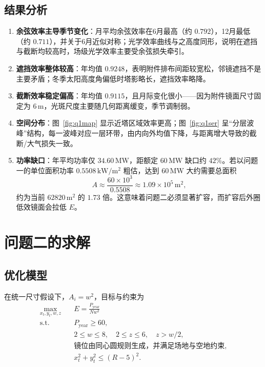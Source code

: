 \documentclass[withoutpreface,bwprint]{cumcmthesis}
\begin{document}
\subsection{结果分析}
\begin{enumerate}[leftmargin=2em]
  \item \textbf{余弦效率主导季节变化}：月平均余弦效率在6月最高（约 $0.792$），12月最低（约 $0.711$），并关于6月近似对称；光学效率曲线与之高度同形，说明在遮挡与截断均较高时，场级光学效率主要受余弦损失牵引。
  \item \textbf{遮挡效率整体较高}：年均值 $0.9248$，表明附件排布间距较宽松，邻镜遮挡不是主要矛盾；冬季太阳高度角偏低时塔影略长，遮挡效率略降。
  \item \textbf{截断效率稳定偏高}：年均值 $0.9115$，且月际变化很小——因为附件镜面尺寸固定为 $6\,\mathrm{m}$，光斑尺度主要随几何距离缓变，季节调制弱。
  \item \textbf{空间分布}：图~\ref{fig:q1map} 显示近塔区域效率更高；图~\ref{fig:q1ser} 呈“分层波峰”结构，每一波峰对应一层环带，由内向外均值下降，与距离增大导致的截断/大气损失一致。
  \item \textbf{功率缺口}：年平均功率仅 $34.60\,\mathrm{MW}$，距额定 $60\,\mathrm{MW}$ 缺口约 $42\%$。若以问题一的单位面积功率 $0.5508\,\mathrm{kW/m^2}$ 粗估，达到 $60\,\mathrm{MW}$ 大约需要总面积
  \[
  A\approx\frac{60\times10^3}{0.5508}\approx1.09\times10^5\,\mathrm{m^2},
  \]
  约为当前 $62820\,\mathrm{m^2}$ 的 $1.73$ 倍。这意味着问题二必须显著扩容，而扩容后外圈低效镜面会拉低 $E$。
\end{enumerate}

\section{问题二的求解}

\subsection{优化模型}
在统一尺寸假设下，$A_i=w^2$，目标与约束为
\begin{equation}
\begin{aligned}
\max_{x_t,y_t,w,z}\quad
& E=\frac{P_{\mathrm{year}}}{N w^2}\\
\mathrm{s.t.}\quad
& P_{\mathrm{year}}\ge 60,\\
& 2\le w\le 8,\quad 2\le z\le 6,\quad z>w/2,\\
& \text{镜位由同心圆规则生成，并满足场地与空地约束},\\
& x_t^2+y_t^2\le(R-5)^2.
\end{aligned}
\label{eq:q2full}
\end{equation}
\end{document}
